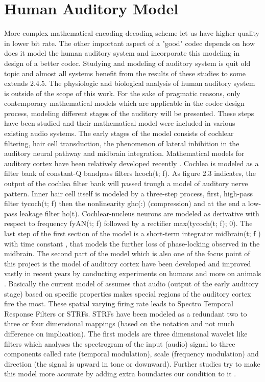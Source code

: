 \section{Human Auditory Model}
More complex mathematical encoding-decoding scheme let us have higher quality in lower
bit rate. The other important aspect of a "good" codec depends on how does it model the
human auditory system and incorporate this modeling in design of a better codec.
Studying and modeling of auditory system is quit old topic and almost all systems benefit
from the results of these studies to some extends 2.4.5. The physiologic and biological
analysis of human auditory system is outside of the scope of this work. For the sake of
pragmatic reasons, only contemporary mathematical models which are applicable in the
codec design process, modeling different stages of the auditory will be presented.
These steps have been studied and their mathematical model were included in various
existing audio systems.
The early stages of the model consists of cochlear filtering, hair cell transduction, the
phenomenon of lateral inhibition in the auditory neural pathway and midbrain integration. Mathematical models for auditory cortex have been relatively developed recently \cite{}.
Cochlea is modeled as a filter bank of constant-Q bandpass filters hcoch(t; f). As figure
2.3 indicates, the output of the cochlea filter bank will passed trough a model of auditory
nerve pattern. Inner hair cell itself is modeled by a three-step process, first, high-pass filter
tycoch(t; f) then the nonlinearity ghc(:) (compression) and at the end a low-pass leakage
filter hc(t). Cochlear-nucleus neurons are modeled as derivative with respect to frequency
fyAN(t; f) followed by a rectifier max(tycoch(t; f); 0). The last step of the first section of
the model is a short-term integrator midbrain(t; f ) with time constant  , that models the
further loss of phase-locking observed in the midbrain. \cite{}
The second part of the model which is also one of the focus point of this project is the
model of auditory cortex have been developed and improved vastly in recent years by
conducting experiments on humans and more on animals \cite{}. Basically the current model
of assumes that audio (output of the early auditory stage) based on specific properties
makes special regions of the auditory cortex fire the most. These spatial varying firing rate
leads to Spectro Temporal Response Filters or STRFs. STRFs have been modeled
as a redundant two to three or four dimensional mappings (based on the notation and
not much difference on implication). The first models are three dimensional wavelet like
filters which analyses the spectrogram of the input (audio) signal to three components
called rate (temporal modulation), scale (frequency modulation) and direction (the signal
is upward in tone or downward). Further studies try to make this model more accurate by
adding extra boundaries our condition to it \cite{}.
